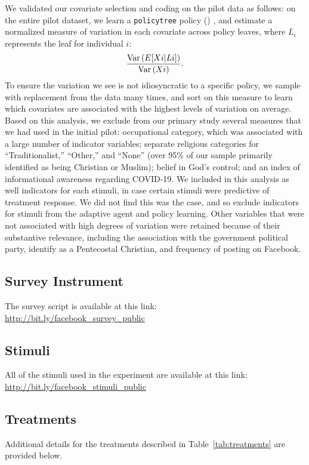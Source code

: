 \documentclass[letterpaper, 12pt, parskip=full,DIV=10]{scrartcl}
\begin{document}
{We validated our covariate selection and coding on the pilot data as follows: on the entire pilot dataset, we learn a \texttt{policytree} policy} (\citealt{sverdrup2020policytree}) {, and estimate a normalized measure of variation in each covariate across policy leaves, where $L_i$ represents the leaf for individual $i$:}
\[
\frac{{\textrm{Var}}\,(E[Xi|Li])}{{\textrm{Var}}\,(Xi)}.
\]
{To ensure the variation we see is not idiosyncratic to a specific policy, we sample with replacement from the data many times, and sort on this measure to learn which covariates are associated with the highest levels of variation on average. Based on this analysis, we exclude from our primary study several measures that we had used in the initial pilot: occupational category, which was associated with a large number of indicator variables; separate religious categories for ``Traditionalist,'' ``Other,'' and ``None'' (over 95\% of our sample primarily identified as being Christian or Muslim); belief in God's control; and an index of informational awareness regarding COVID-19. We included in this analysis as well indicators for each stimuli, in case certain stimuli were predictive of treatment response. We did not find this was the case, and so exclude indicators for stimuli from the adaptive agent and policy learning. Other variables that were not associated with high degrees of variation were retained because of their substantive relevance, including the association with the government political party, identify as a Pentecostal Christian, and frequency of posting on Facebook.}


\subsection{Survey Instrument}\label{appendix:survey}
The survey script is available at this link:\\
\url{http://bit.ly/facebook_survey_public}

\subsection{Stimuli}\label{appendix:stimuli}
All of the stimuli used in the experiment are available at this link:\\
\url{http://bit.ly/facebook_stimuli_public}


\subsection{Treatments}\label{sec:treatments}
Additional details for the treatments described in Table~\ref{tab:treatments} are provided below. 
\end{document}
